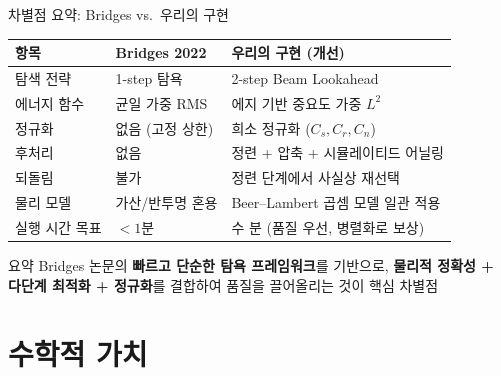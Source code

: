 \documentclass[10pt,aspectratio=169]{beamer}
\begin{document}
\begin{frame}{차별점 요약: Bridges vs.\ 우리의 구현}
  \begin{center}
  \small
  \renewcommand{\arraystretch}{1.2}
  \begin{tabular}{p{3.2cm}p{4.8cm}p{5.2cm}}
    \toprule
    항목 & \textbf{Bridges 2022} & \textbf{우리의 구현 (개선)} \\
    \midrule
    탐색 전략 & 1-step 탐욕 & 2-step Beam Lookahead \\
    에너지 함수 & 균일 가중 RMS & 에지 기반 중요도 가중 $L^2$ \\
    정규화 & 없음 (고정 상한) & 희소 정규화 ($C_s, C_r, C_n$) \\
    후처리 & 없음 & 정련 + 압축 + 시뮬레이티드 어닐링 \\
    되돌림 & 불가 & 정련 단계에서 사실상 재선택 \\
    물리 모델 & 가산/반투명 혼용 & Beer--Lambert 곱셈 모델 일관 적용 \\
    실행 시간 목표 & $< 1$분 & 수 분 (품질 우선, 병렬화로 보상) \\
    \bottomrule
  \end{tabular}
  \end{center}

  \vspace{0.3cm}
  \begin{alertblock}{요약}
    Bridges 논문의 \textbf{빠르고 단순한 탐욕 프레임워크}를 기반으로,
    \textbf{물리적 정확성 + 다단계 최적화 + 정규화}를 결합하여
    품질을 끌어올리는 것이 핵심 차별점
  \end{alertblock}
\end{frame}

\section{수학적 가치}
\end{document}
